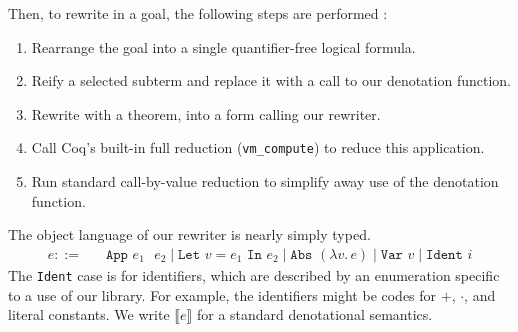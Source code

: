 \documentclass[sn-mathphys,pdflatex]{sn-jnl}%
\makeatletter
\renewcommand{\todo}[2][]{\tikzexternaldisable\@todo[#1]{#2}\tikzexternalenable}
\newcommand{\citetfield}[1]{\usebibentry{#1}{citet}~\cite{#1}}
\newcommand{\tacvmcompute}{\texttt{vm_compute}}
\newcommand{\defeq}{=}
\theoremstyle{thmstyleone}%
\theoremstyle{thmstyletwo}%
\theoremstyle{thmstylethree}%
\makeatother
\begin{document}
Then, to rewrite in a goal, the following steps are performed :
\begin{enumerate}
\item
  Rearrange the goal into a single quantifier-free logical formula.%
\item
  Reify a selected subterm and replace it with a call to our denotation function.
\item
  Rewrite with a theorem, into a form calling our rewriter.
\item Call Coq's built-in full reduction (\tacvmcompute{}) to reduce this application.
\item
  Run standard call-by-value reduction to simplify away use of the denotation function. %
\end{enumerate}


The object language of our rewriter is nearly simply typed.
\begin{align*}
  e ::={}& \phantom{\mid} \texttt{App }e_1\texttt{ }e_2 \mid \texttt{Let }v \defeq e_1\texttt{ In }e_2 %
  \mid \texttt{Abs }(\lambda v.\,e) \mid \texttt{Var }v \mid \texttt{Ident }i
\end{align*}
The \texttt{Ident} case is for identifiers, which are described by an enumeration specific to a use of our library.
For example, the identifiers might be codes for $+$, $\cdot$, and literal constants.
We write $\llbracket e \rrbracket$ for a standard denotational semantics.\label{sec:denote-brackets-def}
\end{document}
